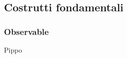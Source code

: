         \subsection{Costrutti fondamentali}\label{subsec:costrutti}
            \subsubsection{Observable}\label{subsec:observable}
            \begin{frame}{\insertsubsectionhead}
                \begin{block}{\texttt{\insertsubsubsectionhead}}
                    Pippo
                \end{block}
            \end{frame}
    \nocite{*}
    \section{\refname}\label{sec:ref}
    \begin{frame}[t,allowframebreaks]
        \frametitle{\insertsectionhead}
        \printbibliography
    \end{frame}

